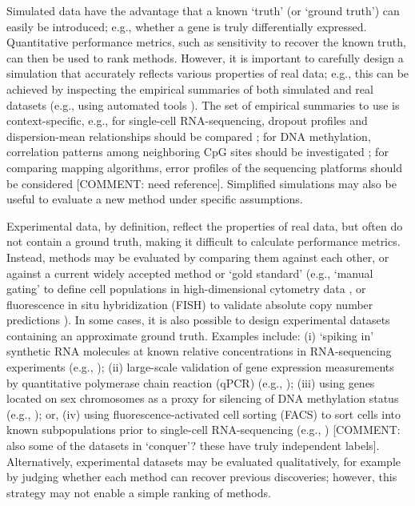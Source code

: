 \documentclass[12pt, a4paper]{article}
\begin{document}
Simulated data have the advantage that a known `truth' (or `ground truth') can easily be introduced; e.g., whether a gene is truly differentially expressed. Quantitative performance metrics, such as sensitivity to recover the known truth, can then be used to rank methods. However, it is important to carefully design a simulation that accurately reflects various properties of real data; e.g., this can be achieved by inspecting the empirical summaries of both simulated and real datasets (e.g., using automated tools \citep{Soneson2017}). The set of empirical summaries to use is context-specific, e.g., for single-cell RNA-sequencing, dropout profiles and dispersion-mean relationships should be compared \citep{Soneson2018}; for DNA methylation, correlation patterns among neighboring CpG sites should be investigated \citep{Korthauer2018}; for comparing mapping algorithms, error profiles of the sequencing platforms should be considered [COMMENT: need reference]. Simplified simulations may also be useful to evaluate a new method under specific assumptions.

Experimental data, by definition, reflect the properties of real data, but often do not contain a ground truth, making it difficult to calculate performance metrics. Instead, methods may be evaluated by comparing them against each other, or against a current widely accepted method or `gold standard' (e.g., `manual gating' to define cell populations in high-dimensional cytometry data \citep{Weber2016, Aghaeepour2013}, or fluorescence in situ hybridization (FISH) to validate absolute copy number predictions \citep{Zheng2017a}). In some cases, it is also possible to design experimental datasets containing an approximate ground truth. Examples include: (i) `spiking in' synthetic RNA molecules at known relative concentrations \citep{Jiang2011} in RNA-sequencing experiments (e.g., \citep{Garalde2018, SEQCMAQCIII2014}); (ii) large-scale validation of gene expression measurements by quantitative polymerase chain reaction (qPCR) (e.g., \citep{SEQCMAQCIII2014}); (iii) using genes located on sex chromosomes as a proxy for silencing of DNA methylation status (e.g., \citep{Law2014, Fang2012}); or, (iv) using fluorescence-activated cell sorting (FACS) to sort cells into known subpopulations prior to single-cell RNA-sequencing (e.g., \citep{TabulaMuris2018, Zheng2017b}) [COMMENT: also some of the datasets in `conquer'? these have truly independent labels]. Alternatively, experimental datasets may be evaluated qualitatively, for example by judging whether each method can recover previous discoveries; however, this strategy may not enable a simple ranking of methods.
\end{document}
